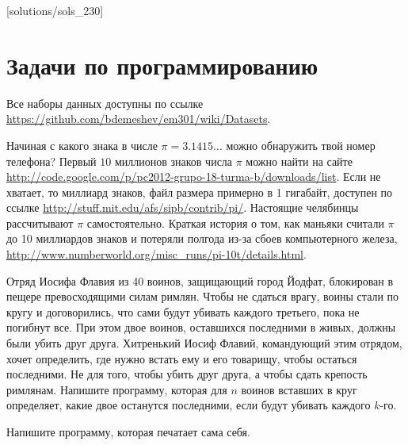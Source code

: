 [solutions/sols_230]

\chapter{Задачи по программированию}


Все наборы данных доступны по ссылке \url{https://github.com/bdemeshev/em301/wiki/Datasets}.


\begin{problem}
Начиная с какого знака в числе $\pi=3.1415\ldots$ можно обнаружить твой номер телефона? Первый $10$ миллионов знаков числа $\pi$ можно найти на сайте \url{http://code.google.com/p/pc2012-grupo-18-turma-b/downloads/list}. Если не хватает, то миллиард знаков, файл размера примерно в 1 гигабайт, доступен по ссылке \url{http://stuff.mit.edu/afs/sipb/contrib/pi/}. Настоящие челябинцы рассчитывают $\pi$ самостоятельно. Краткая история о том, как маньяки считали $\pi$ до 10 миллиардов знаков и потеряли полгода из-за сбоев компьютерного железа, \url{http://www.numberworld.org/misc_runs/pi-10t/details.html}.


\begin{sol}
\end{sol}
\end{problem}



\begin{problem}
Отряд Иосифа Флавия из 40 воинов, защищающий город Йодфат, блокирован в пещере превосходящими силам римлян. Чтобы не сдаться врагу, воины стали по кругу и договорились, что сами будут убивать каждого третьего, пока не погибнут все. При этом двое воинов, оставшихся последними в живых, должны были убить друг друга. Хитренький Иосиф Флавий, командующий этим отрядом, хочет определить, где нужно встать ему и его товарищу, чтобы остаться последними. Не для того, чтобы убить друг друга, а чтобы сдать крепость римлянам. Напишите программу, которая для $n$ воинов вставших в круг определяет, какие двое останутся последними, если будут убивать каждого $k$-го.


\begin{sol}
\end{sol}
\end{problem}



\begin{problem}
Напишите программу, которая печатает сама себя.
\begin{sol}
\end{sol}
\end{problem}


